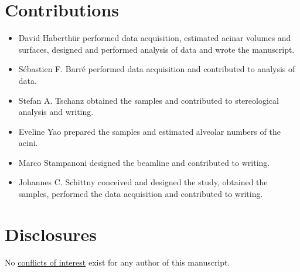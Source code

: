 \documentclass[final,paper=a4,DIV=calc,abstract,english]{scrartcl}
\begin{document}
\section*{Contributions}
\begin{itemize}
	\item David Haberthür performed data acquisition, estimated acinar volumes and surfaces, designed and performed analysis of data and wrote the manuscript.
	\item Sébastien F. Barré performed data acquisition and contributed to analysis of data.
	\item Stefan A. Tschanz obtained the samples and contributed to stereological analysis and writing.
	\item Eveline Yao prepared the samples and estimated alveolar numbers of the acini.
	\item Marco Stampanoni designed the beamline and contributed to writing.
	\item Johannes C. Schittny conceived and designed the study, obtained the samples, performed the data acquisition and contributed to writing.
\end{itemize}

\section{Disclosures}
No \href{http://www.the-aps.org/mm/Publications/Preparing-Your-Manuscript#conflicts}{conflicts of interest} exist for any author of this manuscript.

\ifJCS
	\singlespacing
\else
\fi



\end{document}
